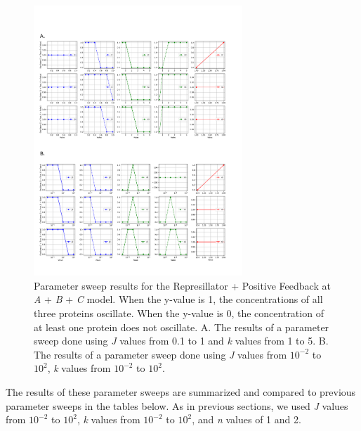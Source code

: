 \documentclass{article}
\begin{document}
\begin{figure}[H]
    \centering
    \includegraphics[width=0.7\textwidth]{figure12.pdf}
    \caption{Parameter sweep results for the Represillator + Positive Feedback at \textit{A} + \textit{B} + \textit{C} model. When the y-value is 1, the concentrations of all three proteins oscillate. When the y-value is 0, the concentration of at least one protein does not oscillate. A. The results of a parameter sweep done using \textit{J} values from 0.1 to 1 and \textit{k} values from 1 to 5. B. The results of a parameter sweep done using \textit{J} values from \( 10^{-2} \) to \( 10^{2} \), \textit{k} values from \( 10^{-2} \) to \( 10^{2} \). }
    \label{fig:12}
\end{figure}

The results of these parameter sweeps are summarized and compared to previous parameter sweeps in the tables below. As in previous sections, we used \textit{J} values from \( 10^{-2} \) to \( 10^{2} \), \textit{k} values from \( 10^{-2} \) to \( 10^{2} \), and \textit{n} values of 1 and 2.
\end{document}
